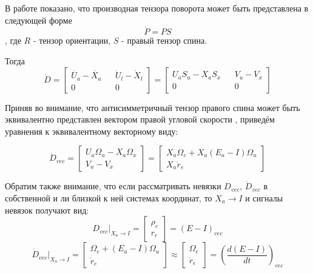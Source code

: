 \documentclass[a4paper]{article}
\begin{document}
В работе \cite{zhilin} показано, что производная тензора поворота может быть представлена в следующей форме
\begin{equation} \dot{P} = P S \end{equation}
, где $R$ - тензор ориентации, $S$ - правый тензор спина.

Тогда 
\begin{equation} 
\dot{D} = \begin{bmatrix}\dot{U_a} - \dot{X_a}&&\dot{U}_l-\dot{X}_l\\0&&0\end{bmatrix} 
= \begin{bmatrix}U_aS_u - X_aS_x&&V_u-V_x\\0&&0\end{bmatrix}\end{equation}

Приняв во внимание, что антисимметричный тензор правого спина может быть эквивалентно представлен вектором правой угловой скорости \cite{zhilin}, приведём уравнения к эквивалентному векторному виду:

\begin{equation}\dot{D}_{vec} = \begin{bmatrix}U_a\Omega_u-X_a\Omega_x\\ V_u-V_x\end{bmatrix}=\begin{bmatrix}X_a\Omega_e + X_a(E_a-I)\Omega_u\\ X_a\dot{r}_e\end{bmatrix}\end{equation}

Обратим также внимание, что если рассматривать невязки $D_{vec}$, $\dot{D}_{vec}$ в собственной и ли близкой к ней системах координат, то $X_a\rightarrow I$ и сигналы невязок получают вид:
\begin{equation} \label{simpl1} D_{vec}|_{X_a\rightarrow I} = \begin{bmatrix}\rho_e\\r_e\end{bmatrix} = (E-I)_{vec} \end{equation}
\begin{equation} \label{simpl2}\dot{D}_{vec}|_{X_a\rightarrow I} = \begin{bmatrix}\Omega_e + (E_a-I)\Omega_u\\ \dot{r}_e\end{bmatrix}\approx\begin{bmatrix}\Omega_e\\ \dot{r}_e\end{bmatrix} = \left(\frac{d(E-I)}{dt}\right)_{vec}
\end{equation}
\end{document}
